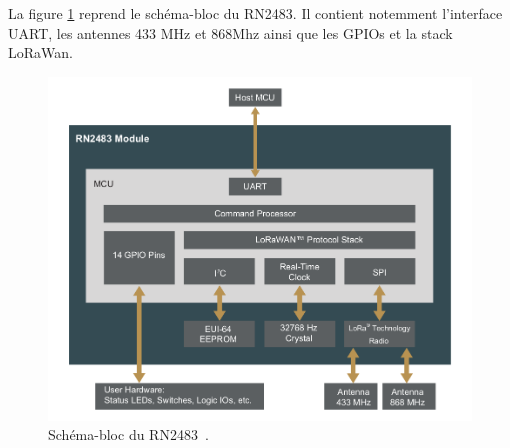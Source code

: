     La figure \ref{fig:state-rn2484-block} reprend le schéma-bloc du RN2483. Il contient notemment l'interface UART, les antennes 433 MHz et 868Mhz ainsi que les GPIOs et la stack LoRaWan.
    \begin{figure}[H]
        \centering
        \includegraphics[scale=0.3]{res/pictures/rn2483-block-diagram.png}
        \caption{Schéma-bloc du RN2483~\cite{rn2483:datasheet}.}
        \label{fig:state-rn2484-block}
    \end{figure}

